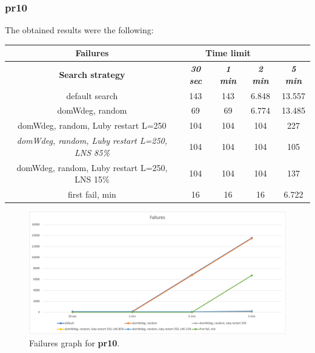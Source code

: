 \subsubsection{pr10}
The obtained results were the following:
{
\renewcommand{\arraystretch}{2}
\begin{longtable}[h]{| c | c | c | c | c |}
    \hline
    \textbf{Failures} & \multicolumn{3}{c}{Time limit} & \\
    \hline
    \textbf{Search strategy} & \textbf{\textit{30 sec}} & \textbf{\textit{1 min}} & \textbf{\textit{2 min}} & \textbf{\textit{5 min}} \\
    \hline
    \endhead
    default search                                         & 143 &  143 &  6.848 & 13.557 \\
    \hline
    domWdeg, random                                        &  69 &   69 &  6.774 & 13.485 \\
    \hline
    domWdeg, random, Luby restart L=250                    & 104 &  104 &  104 &    227 \\
    \hline
    \textit{domWdeg, random, Luby restart L=250, LNS 85\%} & 104 &  104 &  104 &    105 \\
    \hline
    domWdeg, random, Luby restart L=250, LNS 15\%          & 104 &  104 &  104 &    137 \\
    \hline
    first fail, min                                        &  16 &   16 &   16 &   6.722 \\
    \hline
\end{longtable}
}
\begin{figure}[H]
    \centering
    \includegraphics[width=0.8\columnwidth]{../graphs/pr10-failures.png}
    \caption{Failures graph for \textbf{pr10}.}
\end{figure}

